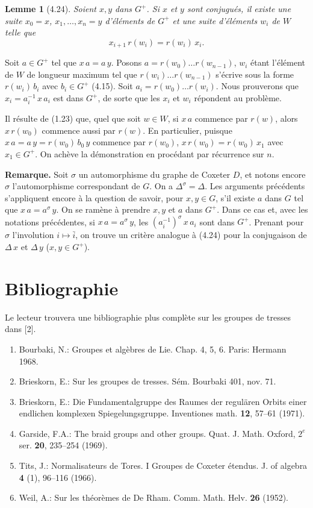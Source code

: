 \documentclass[12pt]{article}
\newtheorem{lemme}[theoreme]{Lemme}
\theoremstyle{remark}
\begin{document}
\begin{lemme}[4.24]
Soient $x, y$ dans $G^+$. Si $x$ et $y$ sont conjugués, il existe une suite $x_0 = x$, $x_1, \ldots, x_n = y$ d'éléments de $G^+$ et une suite d'éléments $w_i$ de $W$ telle que
\[x_{i+1} \, r(w_i) = r(w_i) \, x_i.\]
\end{lemme}

Soit $a \in G^+$ tel que $x \, a = a \, y$. Posons $a = r(w_0) \ldots r(w_{n-1})$, $w_i$ étant l'élément de $W$ de longueur maximum tel que $r(w_i) \ldots r(w_{n-1})$ s'écrive sous la forme $r(w_i) \, b_i$ avec $b_i \in G^+$ (4.15). Soit $a_i = r(w_0) \ldots r(w_i)$. Nous prouverons que $x_i = a_i^{-1} \, x \, a_i$ est dans $G^+$, de sorte que les $x_i$ et $w_i$ répondent au problème.

Il résulte de (1.23) que, quel que soit $w \in W$, si $x \, a$ commence par $r(w)$, alors $x \, r(w_0)$ commence aussi par $r(w)$. En particulier, puisque $x \, a = a \, y = r(w_0) \, b_0 \, y$ commence par $r(w_0)$, $x \, r(w_0) = r(w_0) \, x_1$ avec $x_1 \in G^+$. On achève la démonstration en procédant par récurrence sur $n$.

\noindent \textbf{Remarque.} Soit $\sigma$ un automorphisme du graphe de Coxeter $D$, et notons encore $\sigma$ l'automorphisme correspondant de $G$. On a $\Delta^\sigma = \Delta$. Les arguments précédents s'appliquent encore à la question de savoir, pour $x, y \in G$, s'il existe $a$ dans $G$ tel que $x \, a = a^\sigma \, y$. On se ramène à prendre $x, y$ et $a$ dans $G^+$. Dans ce cas et, avec les notations précédentes, si $x \, a = a^\sigma \, y$, les $(a_i^{-1})^\sigma \, x \, a_i$ sont dans $G^+$. Prenant pour $\sigma$ l'involution $i \mapsto \bar{i}$, on trouve un critère analogue à (4.24) pour la conjugaison de $\Delta \, x$ et $\Delta \, y$ ($x, y \in G^+$).

\section*{Bibliographie}

Le lecteur trouvera une bibliographie plus complète sur les groupes de tresses dans [2].

\begin{enumerate}
\item[{[1]}] Bourbaki, N.: Groupes et algèbres de Lie. Chap. 4, 5, 6. Paris: Hermann 1968.
\item[{[2]}] Brieskorn, E.: Sur les groupes de tresses. Sém. Bourbaki 401, nov. 71.
\item[{[3]}] Brieskorn, E.: Die Fundamentalgruppe des Raumes der regulären Orbits einer endlichen komplexen Spiegelungsgruppe. Inventiones math. \textbf{12}, 57--61 (1971).
\item[{[4]}] Garside, F.A.: The braid groups and other groups. Quat. J. Math. Oxford, $2^e$ ser. \textbf{20}, 235--254 (1969).
\item[{[5]}] Tits, J.: Normalisateurs de Tores. I Groupes de Coxeter étendus. J. of algebra \textbf{4} (1), 96--116 (1966).
\item[{[6]}] Weil, A.: Sur les théorèmes de De Rham. Comm. Math. Helv. \textbf{26} (1952).
\end{enumerate}
\end{document}
